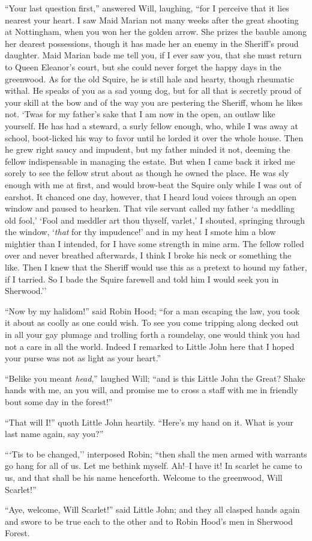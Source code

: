 ``Your last question first,'' answered Will, laughing, ``for I perceive
that it lies nearest your heart. I saw Maid Marian not many weeks after
the great shooting at Nottingham, when you won her the golden arrow. She
prizes the bauble among her dearest possessions, though it has made her
an enemy in the Sheriff's proud daughter. Maid Marian bade me tell you,
if I ever saw you, that she must return to Queen Eleanor's court, but
she could never forget the happy days in the greenwood. As for the old
Squire, he is still hale and hearty, though rheumatic withal. He speaks
of you as a sad young dog, but for all that is secretly proud of your
skill at the bow and of the way you are pestering the Sheriff, whom he
likes not. `Twas for my father's sake that I am now in the open, an
outlaw like yourself. He has had a steward, a surly fellow enough, who,
while I was away at school, boot-licked his way to favor until he lorded
it over the whole house. Then he grew right saucy and impudent, but my
father minded it not, deeming the fellow indispensable in managing the
estate. But when I came back it irked me sorely to see the fellow strut
about as though he owned the place. He was sly enough with me at first,
and would brow-beat the Squire only while I was out of earshot. It
chanced one day, however, that I heard loud voices through an open
window and paused to hearken. That vile servant called my father `a
meddling old fool,' `Fool and meddler art thou thyself, varlet,' I
shouted, springing through the window, `\emph{that} for thy impudence!'
and in my heat I smote him a blow mightier than I intended, for I have
some strength in mine arm. The fellow rolled over and never breathed
afterwards, I think I broke his neck or something the like. Then I knew
that the Sheriff would use this as a pretext to hound my father, if I
tarried. So I bade the Squire farewell and told him I would seek you in
Sherwood.''

``Now by my halidom!'' said Robin Hood; ``for a man escaping the law,
you took it about as coolly as one could wish. To see you come tripping
along decked out in all your gay plumage and trolling forth a roundelay,
one would think you had not a care in all the world. Indeed I remarked
to Little John here that I hoped your purse was not as light as your
heart.''

``Belike you meant \emph{head},'' laughed Will; ``and is this Little
John the Great? Shake hands with me, an you will, and promise me to
cross a staff with me in friendly bout some day in the forest!''

``That will I!'' quoth Little John heartily. ``Here's my hand on it.
What is your last name again, say you?''

```Tis to be changed,'' interposed Robin; ``then shall the men armed
with warrants go hang for all of us. Let me bethink myself. Ah!--I have
it! In scarlet he came to us, and that shall be his name henceforth.
Welcome to the greenwood, Will Scarlet!''

``Aye, welcome, Will Scarlet!'' said Little John; and they all clasped
hands again and swore to be true each to the other and to Robin Hood's
men in Sherwood Forest.
